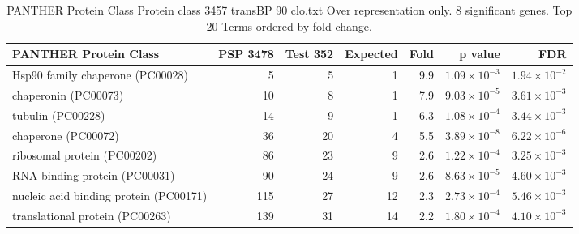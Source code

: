 \begin{table}[ht]
\centering
\begin{adjustbox}{width=\textwidth}
\begin{tabular}{lrrrrrr}
  \hline
PANTHER Protein Class & PSP 3478 & Test 352 & Expected & Fold & p value & FDR \\ 
  \hline
Hsp90 family chaperone (PC00028) & 5 & 5 & 1 & 9.9 & $1.09 \times 10^{-3}$ & $1.94 \times 10^{-2}$ \\ 
  chaperonin (PC00073) & 10 & 8 & 1 & 7.9 & $9.03 \times 10^{-5}$ & $3.61 \times 10^{-3}$ \\ 
  tubulin (PC00228) & 14 & 9 & 1 & 6.3 & $1.08 \times 10^{-4}$ & $3.44 \times 10^{-3}$ \\ 
  chaperone (PC00072) & 36 & 20 & 4 & 5.5 & $3.89 \times 10^{-8}$ & $6.22 \times 10^{-6}$ \\ 
  ribosomal protein (PC00202) & 86 & 23 & 9 & 2.6 & $1.22 \times 10^{-4}$ & $3.25 \times 10^{-3}$ \\ 
  RNA binding protein (PC00031) & 90 & 24 & 9 & 2.6 & $8.63 \times 10^{-5}$ & $4.60 \times 10^{-3}$ \\ 
  nucleic acid binding protein (PC00171) & 115 & 27 & 12 & 2.3 & $2.73 \times 10^{-4}$ & $5.46 \times 10^{-3}$ \\ 
  translational protein (PC00263) & 139 & 31 & 14 & 2.2 & $1.80 \times 10^{-4}$ & $4.10 \times 10^{-3}$ \\ 
   \hline
\end{tabular}
\end{adjustbox}
\caption{PANTHER Protein Class Protein class 3457 transBP 90 clo.txt Over representation only. 8 significant genes. Top 20 Terms ordered by fold change. } 
\label{tab:PANTHER Protein Class Protein class 3457 transBP 90 clo.txt Over representation only. 8 significant genes. Top 20 Terms ordered by fold change. }
\end{table}



